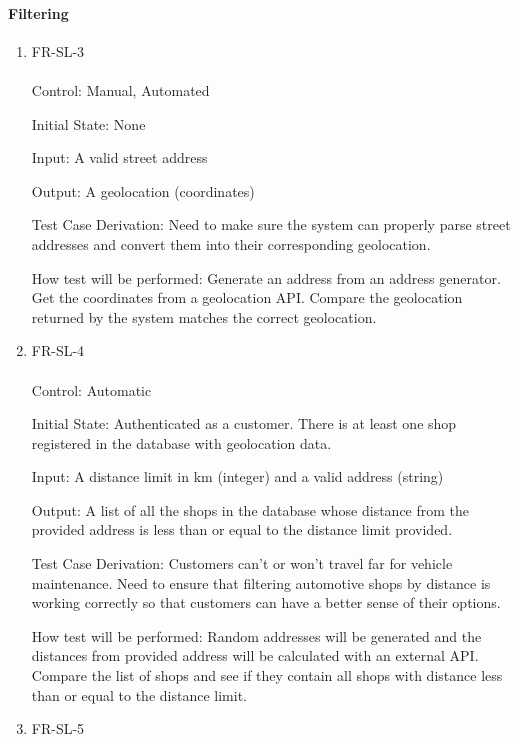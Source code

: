 \documentclass[12pt, titlepage]{article}
\begin{document}
    \paragraph{Filtering}
        \begin{enumerate}
            \item{FR-SL-3} \\ \\
                Control: Manual, Automated \par
                Initial State: None \par
                Input: A valid street address\par
                Output: A geolocation (coordinates)\par
                Test Case Derivation: Need to make sure the system can properly parse street addresses and convert them into their corresponding geolocation.\par
                How test will be performed: Generate an address from an address generator. Get the coordinates from a geolocation API. Compare the geolocation returned by the system matches the correct geolocation.\par
            \item{FR-SL-4} \\ \\
                Control: Automatic \par
                Initial State: Authenticated as a customer. There is at least one shop registered in the database with geolocation data.\par
                Input: A distance limit in km (integer) and a valid address (string)\par
                Output: A list of all the shops in the database whose distance from the provided address is less than or equal to the distance limit provided.\par
                Test Case Derivation: Customers can't or won't travel far for vehicle maintenance. Need to ensure that filtering automotive shops by distance is working correctly so that customers can have a better sense of their options.\par
                How test will be performed: Random addresses will be generated and the distances from provided address will be calculated with an external API. Compare the list of shops and see if they contain all shops with distance less than or equal to the distance limit.\par
            \item{FR-SL-5} \\ \\

\end{enumerate}
\end{document}
